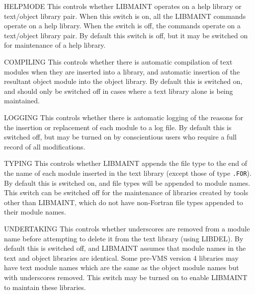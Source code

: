 \newlength{\numlen}
\settowidth{\numlen}{000000000000}
\settowidth{\labelsep}{000}

\begin{list}{}{\setlength{\labelwidth}{\numlen}\setlength{\leftmargin}{\numlen}
\addtolength{\leftmargin}{\labelsep}}

\item[HELPMODE] This controls whether LIBMAINT operates on a help
library or text/object library pair.
When this switch is on, all the LIBMAINT commands operate on a help
library.
When the switch is off, the commands operate on a text/object library
pair.
By default this switch is off, but it may be switched on for maintenance
of a help library.

\item[COMPILING] This controls whether there is automatic compilation of
text modules when they are inserted into a library, and automatic
insertion of the resultant object module into the object library.
By default this is switched on, and should only be switched off in cases
where a text library alone is being maintained.

\item[LOGGING] This controls whether there is automatic logging of the
reasons for the insertion or replacement of each module to a log file.
By default this is switched off, but may be turned on by conscientious
users who require a full record of all modifications.

\item[TYPING] This controls whether LIBMAINT appends the file type to the end
of the name of each module inserted in the text library (except those of
type {\tt .FOR}).
By default this is switched on, and file types will be appended to
module names.
This switch can be switched off for the maintenance of libraries created
by tools other than LIBMAINT, which do not have non-Fortran file types
appended to their module names.

\item[UNDERTAKING] This controls whether underscores are removed from a
module name before attempting to delete it from the text library
(using LIBDEL).
By default this is switched off, and LIBMAINT assumes that module names
in the text and object libraries are identical.
Some pre-VMS version 4 libraries may have text module names which
are the same as the object module names but with underscores removed.
This switch may be turned on to enable LIBMAINT to maintain these
libraries.
\end{list}


